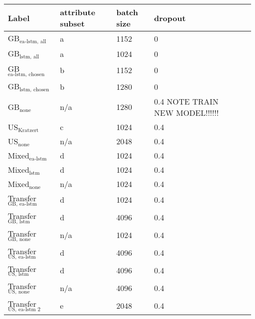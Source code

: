 \begin{tabular}{lllll}
    \toprule
    Label & attribute subset & batch size & dropout \\
    \midrule
    GB$_\text{ea-lstm, all}$ & a &  1152  & 0\\
    GB$_\text{lstm, all}$ & a & 1024 & 0  \\
    GB$_\text{ea-lstm, chosen}$ & b & 1152 & 0 \\
    GB$_\text{lstm, chosen}$ & b & 1280 & 0\\
    GB$_\text{none}$ & n/a & 1280 & 0.4 NOTE TRAIN NEW MODEL!!!!!!\\
    US$_\text{Kratzert}$  & c & 1024 & 0.4 \\
    US$_\text{none}$  & n/a & 2048 & 0.4\\
    Mixed$_\text{ea-lstm}$ & d & 1024 & 0.4\\
    Mixed$_\text{lstm}$ & d & 1024 & 0.4\\
    Mixed$_\text{none}$ & n/a & 1024 & 0.4\\
    Transfer$_\text{GB, ea-lstm}$ & d  & 1024 & 0.4 \\
    Transfer$_\text{GB, lstm}$ & d  & 4096 & 0.4\\
    Transfer$_\text{GB, none}$ & n/a & 1024 & 0.4 \\
    Transfer$_\text{US, ea-lstm}$ & d & 4096 & 0.4 \\
    Transfer$_\text{US, lstm}$  & d & 4096 & 0.4 \\ 
    Transfer$_\text{US, none}$  & n/a & 4096 & 0.4 \\
    Transfer$_\text{US, ea-lstm 2}$ & e & 2048 & 0.4 \\

\end{tabular}

